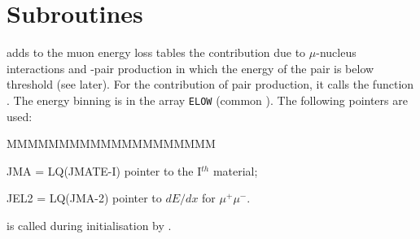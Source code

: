   
  
\section{Subroutines}
 adds to the muon energy loss tables the contribution 
due to $\mu$-nucleus interactions and \Pep\Pem-pair production in 
which the energy of the pair is below threshold (see later).
For the contribution of pair production, it calls the function 
. The energy binning is in the array {\tt ELOW} (common 
). The following pointers are used:

\begin{DLtt}{MMMMMMMMMMMMMMMMMMMM}
\item[JMA  = LQ(JMATE-I)] pointer to the I$^{th}$ material;
\item[JEL2 = LQ(JMA-2)]  pointer to $dE/dx$ for $\mu^+\mu^-$.
\end{DLtt}

 is called during initialisation by .


